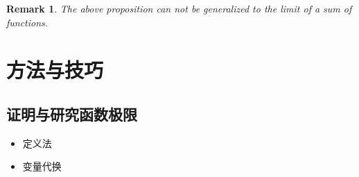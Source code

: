 \documentclass[onecolumn]{ctexart}
\newtheorem{remark}{Remark}
\begin{document}
\begin{remark}
  The above proposition can not be generalized to the limit of a sum of 
  functions.
\end{remark}

\section{方法与技巧}

\subsection{证明与研究函数极限}

\begin{itemize}
  \item 定义法
  \item 变量代换
\end{itemize}
\end{document}
